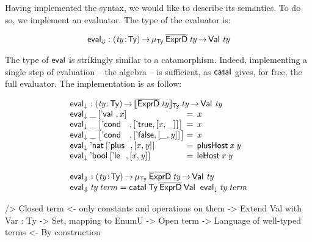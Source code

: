 Having implemented the syntax, we would like to describe its
semantics. To do so, we implement an evaluator. The type of the
evaluator is:

\[
\evalH : \PI{\V{ty}}{\Ty} 
         \IMu{\Ty}{\toIDesc{\HExprD}}{\V{ty}} \To
         \Val{\V{ty}}
\]

The type of $\F{eval}$ is strikingly similar to a
catamorphism. Indeed, implementing a single step of evaluation -- the
algebra -- is sufficient, as $\F{cataI}$  gives, for free, the full evaluator. The implementation
is as follow:


\[\stk{
\evalOne : \PI{\V{ty}}{\Ty} \idescop{\toIDesc{\HExprD}\: \V{ty}}{\Ty}{\V{ty}}
\To {\Val{\V{ty}}} \\
\begin{array}{@{}l@{\:=\:\:}l}
\evalOne\: \_\: \pair{\Eval{}}{\V{x}}{}                                         & \V{x} \\
\evalOne\: \_\: \pair{\Econd{}{}{}}{\pair{\BoolTrue}{\pair{\V{x}}{\_}{}}{}}{}   & \V{x} \\
\evalOne\: \_\: \pair{\Econd{}{}{}}{\pair{\BoolFalse}{\pair{\_}{\V{y}}{}}{}}{}  & \V{x} \\
\evalOne\: \Enat\: \pair{\Eplus{}{}}{\pair{\V{x}}{\V{y}}{}}{}                       & \F{plusHost}\: \V{x}\: \V{y} \\
\evalOne\: \Ebool\: \pair{\Ele{}{}}{\pair{\V{x}}{\V{y}}{}}{}                        & \F{leHost}\: \V{x}\: \V{y} 
\end{array} \\
\\
\evalH : \PI{\V{ty}}{\Ty} 
           \IMu{\Ty}{\toIDesc{\HExprD}}{\V{ty}} \To
           \Val{\V{ty}} \\
\evalH\: \V{ty}\: \V{term} = \F{cataI}\: \Ty\: 
                                 \toIDesc{\HExprD}\: 
                                 \Val{}\: 
                                 \evalOne\: 
                                 \V{ty}\: 
                                 \V{term}
}\]

\begin{wstructure}
    /> Closed term
        <- only constants and operations on them
        -> Extend Val with Var : Ty -> Set, mapping to EnumU
            -> Open term
            -> Language of well-typed terms
                <- By construction
\end{wstructure}

